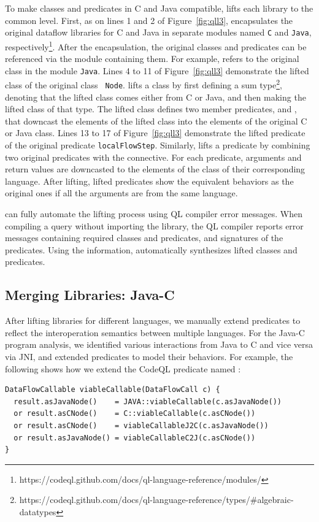 To make classes and predicates in C and Java compatible, \ours lifts each
library to the common level.  First, as on lines 1 and 2 of
Figure~\ref{fig:qll3}, \ours encapsulates the original dataflow libraries for C
and Java in separate modules named {\tt C} and {\tt Java},
respectively\footnote{https://codeql.github.com/docs/ql-language-reference/modules/}.
After the encapsulation, the original classes and predicates can be referenced
via the module containing them.  For example,  refers to the
original class  in the module {\tt Java}.  Lines 4 to 11 of
Figure~\ref{fig:qll3} demonstrate the lifted class of the original class {\tt
Node}.  \ours lifts a class by first defining a sum
type\footnote{https://codeql.github.com/docs/ql-language-reference/types/\#algebraic-datatypes},
denoting that the lifted class comes either from C or Java, and then making the
lifted class of that type.  The lifted class defines two member predicates,
 and , that downcast the elements of the
lifted class into the elements of the original C or Java class.  Lines 13 to 17
of Figure~\ref{fig:qll3} demonstrate the lifted predicate of the original
predicate {\tt localFlowStep}.  Similarly, \ours lifts a predicate by combining
two original predicates with the  connective. For each predicate,
arguments and return values are downcasted to the elements of the class of
their corresponding language.  After lifting, lifted predicates show the
equivalent behaviors as the original ones if all the arguments are from the
same language.

\ours can fully automate the lifting process using QL compiler error messages.
When compiling a query without importing the library, the QL compiler reports
error messages containing required classes and predicates, and signatures of
the predicates. Using the information, \ours automatically synthesizes lifted
classes and predicates.

\subsection{Merging Libraries: Java-C}\label{sec:merging}
After lifting libraries for different languages, we manually extend predicates
to reflect the interoperation semantics between multiple languages.  For the
Java-C program analysis, we identified various interactions from Java to C and
vice versa via JNI, and extended predicates to model their behaviors.  For
example, the following shows how we extend the CodeQL predicate
named :
\begin{lstlisting}[style=codeql,xleftmargin=2.5em]
DataFlowCallable viableCallable(DataFlowCall c) {
  result.asJavaNode()    = JAVA::viableCallable(c.asJavaNode())
  or result.asCNode()    = C::viableCallable(c.asCNode())
  or result.asCNode()    = viableCallableJ2C(c.asJavaNode())
  or result.asJavaNode() = viableCallableC2J(c.asCNode())
}
\end{lstlisting}

